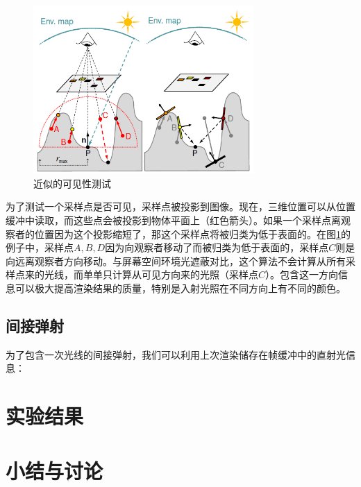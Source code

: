 \documentclass[10pt,a4paper]{article}
\theoremstyle{mythm}%
\numberwithin{equation}{section}
\begin{document}
\begin{CJK*}{UTF8}{song}
\begin{figure}[htbp]
    \vspace{-1mm}
	\centering
  	\includegraphics[width=0.75\textwidth]{fig/occluder}
    \vspace{-4mm}
  	\caption{近似的可见性测试}
  	\label{fig:occluder}
    \vspace{-1mm}
\end{figure}

为了测试一个采样点是否可见，采样点被投影到图像。现在，三维位置可以从位置缓冲中读取，而这些点会被投影到物体平面上（红色箭头）。如果一个采样点离观察者的位置因为这个投影缩短了，那这个采样点将被归类为低于表面的。在图\ref{fig:occluder}的例子中，采样点$A,B,D$因为向观察者移动了而被归类为低于表面的，采样点$C$则是向远离观察者方向移动。与屏幕空间环境光遮蔽对比，这个算法不会计算从所有采样点来的光线，而单单只计算从可见方向来的光照（采样点$C$）。包含这一方向信息可以极大提高渲染结果的质量，特别是入射光照在不同方向上有不同的颜色。

\subsection{间接弹射}

为了包含一次光线的间接弹射，我们可以利用上次渲染储存在帧缓冲中的直射光信息：

%
%
%
%

\section{实验结果}

\section{小结与讨论}



\end{CJK*}
\end{document}

